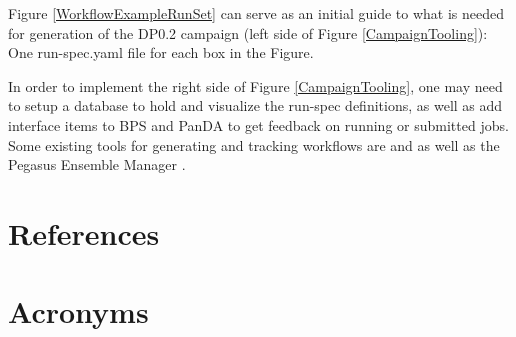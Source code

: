 \documentclass[DM,authoryear,toc]{lsstdoc}
\begin{document}
Figure \ref{WorkflowExampleRunSet} can serve as an initial guide to
what is needed for generation of the DP0.2 campaign (left side of Figure 
\ref{CampaignTooling}): One run-spec.yaml file for each box in the Figure.  

In order to implement the right side of Figure \ref{CampaignTooling}, one may
need to setup a database to hold and visualize the run-spec definitions, 
as well as add interface items to BPS and PanDA to get feedback on running
or submitted jobs.  Some existing tools for generating and tracking 
workflows are \cite{airflow} and \cite{POMS} as well as the Pegasus Ensemble Manager \cite{PEM}.


\appendix
\section{References} \label{sec:bib}
\renewcommand{\refname}{} %


\section{Acronyms} \label{sec:acronyms}

\end{document}
